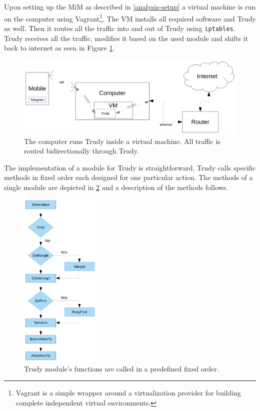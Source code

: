 \documentclass[thesis=M,english]{FITthesis}[2012/10/20]
\begin{document}
Upon setting up the MiM as described in \ref{analysis-setup} a virtual machine is run on the computer using Vagrant\footnote{Vagrant is a simple wrapper around a virtualization provider for building complete independent virtual environments.}. The VM installs all required software and Trudy as well. Then it routes all the traffic into and out of Trudy using \texttt{iptables}. Trudy receives all the traffic, modifies it based on the used module and shifts it back to internet as seen in Figure \ref{img:analysis-trudy-setup}.

\begin{figure}[htb]
	\centering
	\includegraphics[width=1\textwidth]{setup-trudy.pdf}
	\caption[Trudy setup]{The computer runs Trudy inside a virtual machine. All traffic is routed bidirectionally through Trudy.}
	\label{img:analysis-trudy-setup}
\end{figure}


The implementation of a module for Trudy is straightforward. Trudy calls specific methods in fixed order each designed for one particular action. The methods of a single module are depicted in \ref{img:analysis-trudy-flow} and a description of the methods follows.

\begin{figure}
	\centering
	\includegraphics[width=0.34\textwidth]{trudy-flow.pdf}
	\caption[Trudy's data flow]{Trudy module's functions are called in a predefined fixed order.}
	\label{img:analysis-trudy-flow}
\end{figure}
\end{document}
